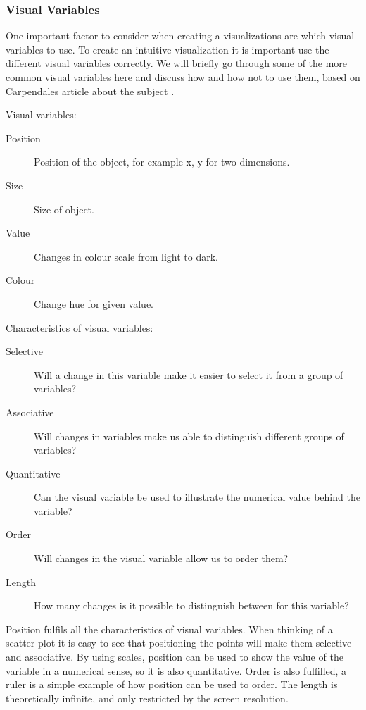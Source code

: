 \subsubsection{Visual Variables}
One important factor to consider when creating a visualizations are which visual variables to use. To create an intuitive visualization it is important use the different visual variables correctly. We will briefly go through some of the more common visual variables here and discuss how and how not to use them, based on Carpendales article about the subject \cite{carpendale}.

Visual variables:
\begin{description}
    \item[Position] Position of the object, for example x, y for two dimensions.
    \item[Size] Size of object.
    \item[Value] Changes in colour scale from light to dark.
    \item[Colour] Change hue for given value.
\end{description}

Characteristics of visual variables:
\begin{description}
    \item[Selective] Will a change in this variable make it easier to select it from a group of variables?
    \item[Associative] Will changes in variables make us able to distinguish different groups of variables?
    \item[Quantitative] Can the visual variable be used to illustrate the numerical value behind the variable?
    \item[Order] Will changes in the visual variable allow us to order them?
    \item[Length] How many changes is it possible to distinguish between for this variable?
\end{description}

Position fulfils all the characteristics of visual variables. When thinking of a scatter plot it is easy to see that positioning the points will make them selective and associative. By using scales, position can be used to show the value of the variable in a numerical sense, so it is also quantitative. Order is also fulfilled, a ruler is a simple example of how position can be used to order. The length is theoretically infinite, and only restricted by the screen resolution.


